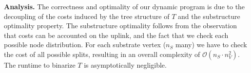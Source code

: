 \documentclass[9pt]{sigcomm-alternate}
\newcommand{\Tree}{\ensuremath{T}}
\newcommand{\CostTrans}{\ensuremath{b_1}}
\newcommand{\CostCom}{\ensuremath{b_2}}
\begin{document}



%

%




\textbf{Analysis.}
The correctness and optimality of our dynamic program
is due to the decoupling of the costs induced by the tree
structure of $\Tree$ and the  substructure
optimality property.
The substructure optimality follows from the observation that
costs can be accounted on the uplink, and the fact
 that we check each possible node distribution.
For each substrate vertex ($n_S$ many) we have
to check the cost of all possible splits,
resulting in an overall complexity of $\mathcal{O}(n_S \cdot n_V^2)$.
The runtime to binarize $\Tree$ is asymptotically negligible.
\end{document}
